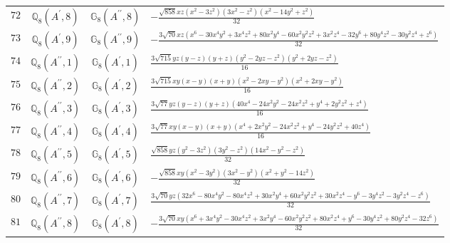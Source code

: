 \documentclass[fleqn,8pt,landscape]{jsarticle}
\begin{document}
\begin{table}[ht!]
\begin{center}
\begin{tabular}{cccl}
$ 72 $ & $ \mathbb{Q}_{8}(A^{\prime},8) $ & $ \mathbb{G}_{8}(A^{\prime\prime},8) $ & $ - \frac{\sqrt{858} x z \left(x^{2} - 3 z^{2}\right) \left(3 x^{2} - z^{2}\right) \left(x^{2} - 14 y^{2} + z^{2}\right)}{32} $ \\
$ 73 $ & $ \mathbb{Q}_{8}(A^{\prime},9) $ & $ \mathbb{G}_{8}(A^{\prime\prime},9) $ & $ - \frac{3 \sqrt{70} x z \left(x^{6} - 30 x^{4} y^{2} + 3 x^{4} z^{2} + 80 x^{2} y^{4} - 60 x^{2} y^{2} z^{2} + 3 x^{2} z^{4} - 32 y^{6} + 80 y^{4} z^{2} - 30 y^{2} z^{4} + z^{6}\right)}{32} $ \\
$ 74 $ & $ \mathbb{Q}_{8}(A^{\prime\prime},1) $ & $ \mathbb{G}_{8}(A^{\prime},1) $ & $ \frac{3 \sqrt{715} y z \left(y - z\right) \left(y + z\right) \left(y^{2} - 2 y z - z^{2}\right) \left(y^{2} + 2 y z - z^{2}\right)}{16} $ \\
$ 75 $ & $ \mathbb{Q}_{8}(A^{\prime\prime},2) $ & $ \mathbb{G}_{8}(A^{\prime},2) $ & $ \frac{3 \sqrt{715} x y \left(x - y\right) \left(x + y\right) \left(x^{2} - 2 x y - y^{2}\right) \left(x^{2} + 2 x y - y^{2}\right)}{16} $ \\
$ 76 $ & $ \mathbb{Q}_{8}(A^{\prime\prime},3) $ & $ \mathbb{G}_{8}(A^{\prime},3) $ & $ \frac{3 \sqrt{77} y z \left(y - z\right) \left(y + z\right) \left(40 x^{4} - 24 x^{2} y^{2} - 24 x^{2} z^{2} + y^{4} + 2 y^{2} z^{2} + z^{4}\right)}{16} $ \\
$ 77 $ & $ \mathbb{Q}_{8}(A^{\prime\prime},4) $ & $ \mathbb{G}_{8}(A^{\prime},4) $ & $ \frac{3 \sqrt{77} x y \left(x - y\right) \left(x + y\right) \left(x^{4} + 2 x^{2} y^{2} - 24 x^{2} z^{2} + y^{4} - 24 y^{2} z^{2} + 40 z^{4}\right)}{16} $ \\
$ 78 $ & $ \mathbb{Q}_{8}(A^{\prime\prime},5) $ & $ \mathbb{G}_{8}(A^{\prime},5) $ & $ \frac{\sqrt{858} y z \left(y^{2} - 3 z^{2}\right) \left(3 y^{2} - z^{2}\right) \left(14 x^{2} - y^{2} - z^{2}\right)}{32} $ \\
$ 79 $ & $ \mathbb{Q}_{8}(A^{\prime\prime},6) $ & $ \mathbb{G}_{8}(A^{\prime},6) $ & $ - \frac{\sqrt{858} x y \left(x^{2} - 3 y^{2}\right) \left(3 x^{2} - y^{2}\right) \left(x^{2} + y^{2} - 14 z^{2}\right)}{32} $ \\
$ 80 $ & $ \mathbb{Q}_{8}(A^{\prime\prime},7) $ & $ \mathbb{G}_{8}(A^{\prime},7) $ & $ \frac{3 \sqrt{70} y z \left(32 x^{6} - 80 x^{4} y^{2} - 80 x^{4} z^{2} + 30 x^{2} y^{4} + 60 x^{2} y^{2} z^{2} + 30 x^{2} z^{4} - y^{6} - 3 y^{4} z^{2} - 3 y^{2} z^{4} - z^{6}\right)}{32} $ \\
$ 81 $ & $ \mathbb{Q}_{8}(A^{\prime\prime},8) $ & $ \mathbb{G}_{8}(A^{\prime},8) $ & $ - \frac{3 \sqrt{70} x y \left(x^{6} + 3 x^{4} y^{2} - 30 x^{4} z^{2} + 3 x^{2} y^{4} - 60 x^{2} y^{2} z^{2} + 80 x^{2} z^{4} + y^{6} - 30 y^{4} z^{2} + 80 y^{2} z^{4} - 32 z^{6}\right)}{32} $ \\
 \hline \hline
\end{tabular}
\end{center}
\end{table}
\end{document}
